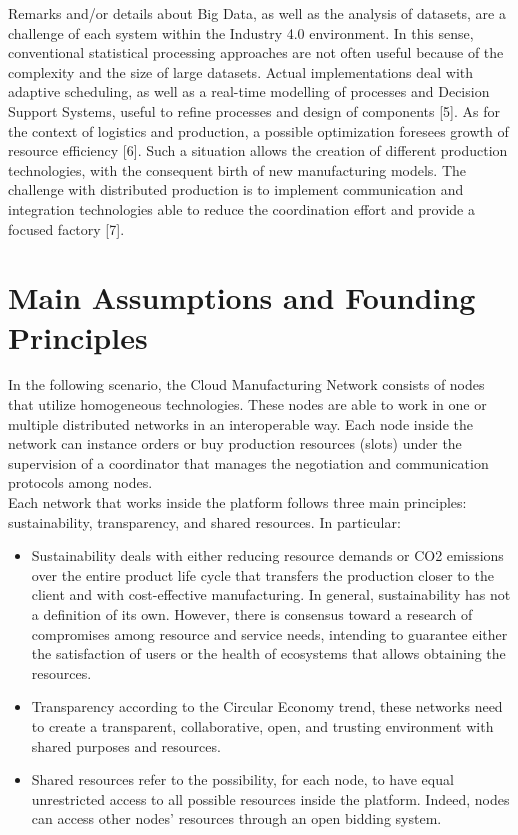 Remarks and/or details about Big Data, as well as the analysis of datasets, are a challenge of each system within the Industry 4.0 environment. In this sense, conventional statistical processing approaches are not often useful because of the complexity and the size of large datasets. Actual implementations deal with adaptive scheduling, as well as a real-time modelling of processes and Decision Support Systems, useful to refine processes and design of components [5]. As for the context of logistics and production, a possible optimization foresees growth of resource efficiency [6]. Such a situation allows the creation of different production technologies, with the consequent birth of new manufacturing models. The challenge with distributed production is to implement communication and integration technologies able to reduce the coordination effort and provide a focused factory [7].
\section{Main Assumptions and Founding Principles}
In the following scenario, the Cloud Manufacturing Network consists of nodes that utilize homogeneous technologies. These nodes are able to work in one or multiple distributed networks in an interoperable way. Each node inside the network can instance orders or buy production resources (slots) under the supervision of a coordinator that manages the negotiation and communication protocols among nodes.\\
Each network that works inside the platform follows three main principles: sustainability, transparency, and shared resources. In particular:
\begin{itemize}
    \item Sustainability deals with either reducing resource demands or CO2 emissions over the entire product life cycle that transfers the production closer to the client and with cost-effective manufacturing. In general, sustainability has not a definition of its own. However, there is consensus toward a research of compromises among resource and service needs, intending to guarantee either the satisfaction of users or the health of ecosystems that allows obtaining the resources.
    \item Transparency according to the Circular Economy trend, these networks need to create a transparent, collaborative, open, and trusting environment with shared purposes and resources.
    \item Shared resources refer to the possibility, for each node, to have equal unrestricted access to all possible resources inside the platform. Indeed, nodes can access other nodes’ resources through an open bidding system.
\end{itemize}

